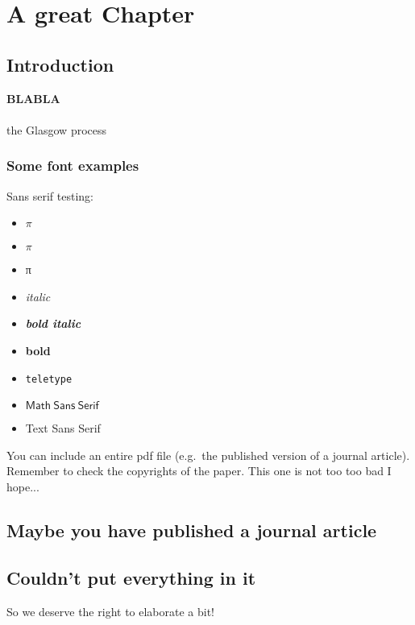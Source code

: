 \chapter{A great Chapter}
\section{Introduction}
\label{sec:ch2_intro}
\textbf{\color{red}BLABLA}
\\\\
the Glasgow process
\subsection{Some font examples}
\label{subsec:ch2_subsec}    
Sans serif testing:
\begin{itemize}
    \item \textsf{$\pi$}
    \item \textsf{$π$}
    \item \textsf{π}
    \item \textsf{\emph{italic}}
    \item \textsf{\textbf{\emph{bold italic}}}
    \item \textsf{\textbf{bold}}
    \item \textsf{\texttt{teletype}}
    \item $\mathsf{Math\ Sans\ Serif}$
    \item \textsf{Text Sans Serif}
\end{itemize}

You can include an entire pdf file (e.g.~the published version of a journal article). Remember to check the copyrights of the paper. This one is not too too bad I hope...
\section{Maybe you have published a journal article}
\label{sec:ch2_paper}

\section{Couldn't put everything in it}
\label{sec:ch2_bbbb}
So we deserve the right to elaborate a bit!
